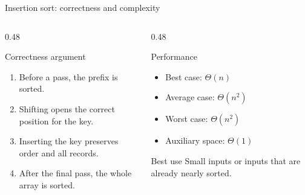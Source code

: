 \documentclass[aspectratio=169]{beamer}
\begin{document}
\begin{frame}{Insertion sort: correctness and complexity}
  \small
  \begin{columns}[T]
    \begin{column}{0.48\textwidth}
      \begin{block}{Correctness argument}
        \begin{enumerate}
          \item Before a pass, the prefix is sorted.
          \item Shifting opens the correct position for the key.
          \item Inserting the key preserves order and all records.
          \item After the final pass, the whole array is sorted.
        \end{enumerate}
      \end{block}
    \end{column}
    \begin{column}{0.48\textwidth}
      \begin{exampleblock}{Performance}
        \begin{itemize}
          \item Best case: $\Theta(n)$
          \item Average case: $\Theta(n^2)$
          \item Worst case: $\Theta(n^2)$
          \item Auxiliary space: $\Theta(1)$
        \end{itemize}
      \end{exampleblock}
      \begin{alertblock}{Best use}
        Small inputs or inputs that are already nearly sorted.
      \end{alertblock}
    \end{column}
  \end{columns}
\end{frame}
\end{document}
